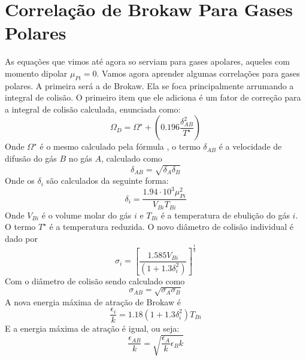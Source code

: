 \section{Correlação de Brokaw Para Gases Polares}
As equações que vimos até agora so serviam para gases apolares, aqueles com momento dipolar
\(\mu_{Pi} = 0\). Vamos agora aprender algumas correlações para gases polares. A primeira será a de
Brokaw. Ela se foca principalmente arrumando a integral de colisão. O primeiro item que ele adiciona
é um fator de correção para a integral de colisão calculada, enunciada como:
\begin{equation}\label{eq:correlacao_brokaw}
    \Omega_{D} = \Omega^{\star} + \left( 0.196 \frac{\delta_{AB}^{2} }{T^{\star} } \right)
\end{equation}
Onde \(\Omega ^{\star} \) é o mesmo calculado pela fórmula , o termo
\(\delta_{AB} \) é a velocidade de difusão do gás \(B\) no gás \(A\), calculado como
\begin{equation}\label{eq:velocidade_difusao_tot}
    \delta_{AB} = \sqrt{\delta_A \delta_{B}}
\end{equation} 
Onde os \(\delta_{i} \) são calculados da seguinte forma:
\begin{equation}\label{eq:velocidade_difusao_individual}
    \delta_{i} = \frac{1.94 \cdot 10^{3} \mu_{Pi}^{2} }{V_{Bi} T_{Bi}  }
\end{equation}
Onde \(V_{Bi} \) é o volume molar do gás \(i\) e \(T_{Bi} \) é a temperatura de ebulição do gás
\(i\). O termo \(T^{\star} \) é a temperatura reduzida. O novo diâmetro de colisão individual é dado por
\begin{equation}\label{eq:diametro_colisao_individual_brokaw}
    \sigma_{i} = \left[ \frac{1.585 V_{Bi} }{\left( 1 + 1.3 \delta_i ^{2}\right) } \right]^{\frac{1}{3}}  
\end{equation}
Com o diâmetro de colisão sendo calculado como
\begin{equation}\label{eq:diametro_colisao_brokaw}
    \sigma_{AB} = \sqrt{\sigma_A \sigma_B} 
\end{equation}
A nova energia máxima de atração de Brokaw é
\begin{equation}\label{eq:energia_atracao_brokaw_individual}
    \frac{\epsilon_{i}}{k} = 1.18 \left( 1 + 1.3 \delta_{i} ^{2}  \right) T_{Bi}
\end{equation}
E a energia máxima de atração é igual, ou seja:
\begin{equation}\label{eq:energia_atracao_brokaw}
    \frac{\epsilon_{AB}}{k} = \sqrt{\frac{\epsilon_{A}}{k}{\epsilon_{B}{k}}}
\end{equation} 
